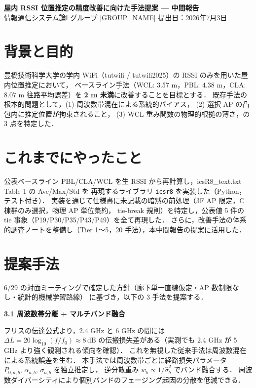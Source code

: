 \documentclass[a4paper]{ltjsarticle}
\begin{document}
\begin{center}
  {\large\bfseries 屋内 RSSI 位置推定の精度改善に向けた手法提案 — 中間報告}\\[3pt]
  {\small 情報通信システム論Ⅰ \quad グループ [GROUP\_NAME]  \quad 提出日：2026年7月3日}
\end{center}

\section{背景と目的}

豊橋技術科学大学の学内 WiFi（tutwifi / tutwifi2025）の RSSI のみを用いた屋内位置推定において，
ベースライン手法（WCL: 3.57 m，PBL: 4.38 m，CLA: 8.07 m \; 往路平均誤差）を \textbf{2 m 未満}に改善することを目標とする．
既存手法の根本的問題として，(1) 周波数帯混在による系統的バイアス，
(2) 選択 AP の凸包内に推定位置が拘束されること，
(3) WCL 重み関数の物理的根拠の薄さ，の 3 点を特定した．

\section{これまでにやったこと}

公表ベースライン PBL/CLA/WCL を生 RSSI から再計算し，icsR8\_text.txt Table 1 の Ave/Max/Std を
再現するライブラリ \texttt{icsr8} を実装した（Python，テスト付き）．
実装を通じて仕様書に未記載の暗黙の前処理（3F AP 限定，C 棟群のみ選択，物理 AP 単位集約，
tie-break 規則）を特定し，公表値 5 件の tie 事象（P19/P30/P35/P43/P49）を全て再現した．
さらに，改善手法の体系的調査ノートを整備し（Tier 1〜5，20 手法），本中間報告の提案に活用した．

\section{提案手法}

6/29 の対面ミーティングで確定した方針（廊下単一直線仮定・AP 数制限なし・統計的機械学習路線）
に基づき，以下の 3 手法を提案する．

\smallskip
\noindent\textbf{3.1 \; 周波数帯分離 + マルチバンド融合}

フリスの伝達公式より，2.4 GHz と 6 GHz の間には
$\Delta L = 20\log_{10}(f/f_0) \approx 8\,\mathrm{dB}$
の伝搬損失差がある（実測でも 2.4 GHz が 5 GHz より強く観測される傾向を確認）．
これを無視した従来手法は周波数混在による系統誤差を生む．
本手法では周波数帯ごとに経路損失パラメータ $P_{0,a,b},\,\alpha_{a,b},\,\sigma_{a,b}$ を独立推定し，
逆分散重み $w_b \propto 1/\hat{\sigma}_b^2$ でバンド融合する．
周波数ダイバーシティにより個別バンドのフェージング起因の分散を低減できる．
\end{document}
